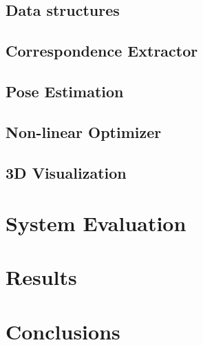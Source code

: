 \documentclass[10pt, a4paper, twoside]{article}
\numberwithin{equation}{subsection}
\numberwithin{figure}{section}
\numberwithin{table}{section}
\begin{document}
\newpage
\subsection{Data structures}
\label{sec:data_structures}


\newpage
\subsection{Correspondence Extractor}
\label{sec:point_extractor}


\newpage
\subsection{Pose Estimation}
\label{sec:pose_estimator}


\newpage
\subsection{Non-linear Optimizer}
\label{sec:nonlin_optimizer}


\newpage
\subsection{3D Visualization}
\label{sec:3d_visualization}


\newpage
\section{System Evaluation}
\label{sec:evaluation}

\pagebreak

\newpage
\section{Results}
\label{sec:results}


\newpage
\section{Conclusions}
\label{sec:conclusions}

\newpage
%
%

\thispagestyle{fancy}
\mbox{}
\newpage




%
\end{document}
